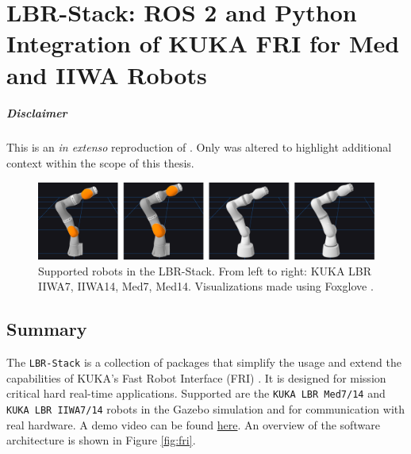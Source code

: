 \chapter[LBR-Stack]{LBR-Stack: ROS 2 and Python Integration of KUKA FRI for Med and
IIWA Robots}
\label{app:lbr_stack}
\minitoc

\paragraph{Disclaimer} This  is an \textit{in extenso} reproduction of \cite{huber2023lbr}. Only  was altered to highlight additional context within the scope of this thesis.

\newpage

\begin{figure}
\centering
\includegraphics[width=\textwidth]{appendix_a/img/joss_figure.png}
\caption[Supported robots in the LBR-Stack. From left to right: KUKA LBR
IIWA7, IIWA14, Med7, Med14. Visualizations made using Foxglove
.]{Supported robots in the LBR-Stack. From left to right: KUKA LBR
IIWA7, IIWA14, Med7, Med14. Visualizations made using Foxglove
\footnotemark{}.}
\end{figure}

\hypertarget{summary}{%
\section{Summary}\label{summary}}
The \texttt{LBR-Stack} is a collection of packages that simplify the
usage and extend the capabilities of KUKA's Fast Robot Interface (FRI)
\cite{ref-fri}. It is designed
for mission critical hard real-time applications. Supported are the
\texttt{KUKA\ LBR\ Med7/14} and \texttt{KUKA\ LBR\ IIWA7/14} robots in
the Gazebo simulation \cite{ref-gazebo} and for communication with real hardware. A demo video can be
found
\href{https://www.linkedin.com/posts/mhubii_robotics-opensource-ros2-activity-7009974676017848320-S3U5/?utm_source=share\&utm_medium=member_desktop}{here}.
An overview of the software architecture is shown in Figure
\ref{fig:fri}.

